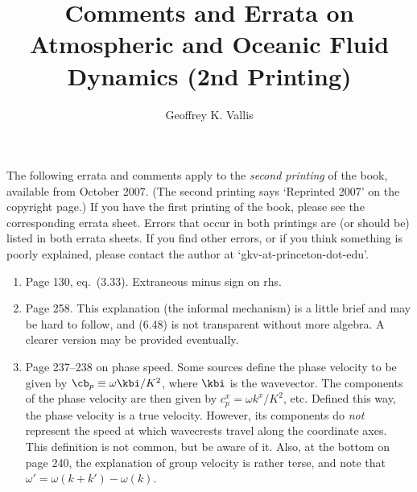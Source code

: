 \documentclass[10pt]{article}
\newcommand{\eq}{eq.\ } \newcommand{\Eq}{Eq.\ }
\begin{document}
\title{\sffamily Comments and Errata on Atmospheric and Oceanic Fluid Dynamics (2nd Printing)}
\author{\sffamily Geoffrey K. Vallis}
\maketitle
%

\noindent 


The following errata and comments apply to the \emph{second printing} of the book, available from October 2007. (The second printing says `Reprinted 2007' on the copyright page.) If you have the first printing of the book, please see the corresponding errata sheet. Errors that occur in both printings are (or should be) listed in both errata sheets. If you find other errors, or if you think something is poorly explained, please contact the author at `gkv-at-princeton-dot-edu'. 

\begin{enumerate}


\item Page 130, \eq (3.33). Extraneous minus sign on rhs.

\item \label{informal} Page 258. This explanation (the informal mechanism) is a little brief and may be hard to follow, and (6.48) is not transparent without more algebra. A clearer version may be provided eventually. 

\item Page 237--238 on phase speed. Some sources define the phase velocity to be given by $\cb_p \equiv \omega \kbi / K^2$, where $\kbi$ is the wavevector. The components of the phase velocity are then given by $c^x_p = \omega k^x/K^2$, etc. Defined this way, the phase velocity is a true velocity. However, its components do \emph{not} represent the speed at which wavecrests travel along the coordinate axes. This definition is not common, but be aware of it. Also, at the bottom on page 240, the explanation of group velocity is rather terse, and note that ${\omega'} = \omega(k+k') - \omega(k)$.

\end{enumerate}
\end{document}
